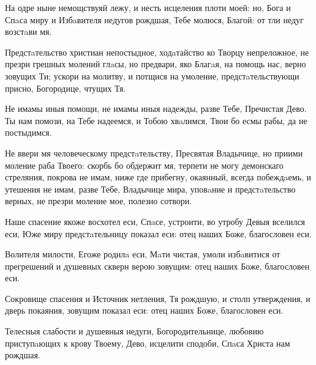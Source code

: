 \begin{mymulticols}
\inyne

На одре ныне немощствуяй лежу, и несть исцеления плоти моей: но, Бога и Спaса миру и Избaвителя недугов рождшая, Тебе молюся, Благой: от тли недуг возстaви мя.


Предстaтельство христиан непостыдное, ходaтайство ко Творцу непреложное, не презри грешных молений глaсы, но предвари, яко Благaя, на помощь нас, верно зовущих Ти; ускори на молитву, и потщися на умоление, предстaтельствующи присно, Богородице, чтущих Тя.


Не имамы иныя помощи, не имамы иныя надежды, разве Тебе, Пречистая Дево. Ты нам помози, на Тебе надеемся, и Тобою хвaлимся, Твои бо есмы рабы, да не постыдимся.


Не ввери мя человеческому предстaтельству, Пресвятая Владычице, но приими моление раба Твоего: скорбь бо обдержит мя, терпети не могу демонскаго стреляния, покрова не имам, ниже где прибегну, окаянный, всегда побеждaемь, и утешения не имам, разве Тебе, Владычице мира, уповaние и предстaтельство верных, не презри моление мое, полезно сотвори.




Наше спасение якоже восхотел еси, Спaсе, устроити, во утробу Девыя вселился еси, Юже миру предстaтельницу показал еси: отец наших Боже, благословен еси.


Волителя милости, Егоже родилa еси, Мaти чистая, умоли избaвитися от прегрешений и душевных скверн верою зовущим: отец наших Боже, благословен еси.

\slava

Сокровище спасения и Источник нетления, Тя рождшую, и столп утверждения, и дверь покаяния, зовущим показал еси: отец наших Боже, благословен еси.

\inyne

Телесныя слабости и душевныя недуги, Богородительнице, любовию приступaющих к крову Твоему, Дево, исцелити сподоби, Спaса Христа нам рождшая.


\end{mymulticols}
